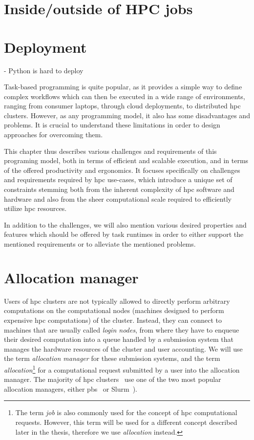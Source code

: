 \section{Inside/outside of HPC jobs}

\section{Deployment}
- Python is hard to deploy

Task-based programming is quite popular, as it provides a simple way to define complex workflows
which can then be executed in a wide range of environments, ranging from consumer laptops, through
cloud deployments, to distributed \gls{hpc} clusters. However, as any programming
model, it also has some disadvantages and problems. It is crucial to understand these limitations
in order to design approaches for overcoming them.

This chapter thus describes various challenges and requirements of this programing model, both in
terms of efficient and scalable execution, and in terms of the offered productivity and ergonomics.
It focuses specifically on challenges and requirements required by \gls{hpc}
use-cases, which introduce a unique set of constraints stemming both from the inherent complexity
of \gls{hpc} software and hardware and also from the sheer computational scale
required to efficiently utilize \gls{hpc} resources.

In addition to the challenges, we will also mention various desired properties and features which
should be offered by task runtimes in order to either support the mentioned requirements or to
alleviate the mentioned problems.

\section{Allocation manager}
\label{sec:allocation-manager}
Users of \gls{hpc} clusters are not typically allowed to directly perform
arbitrary computations on the computational nodes (machines designed to perform expensive
\gls{hpc} computations) of the cluster. Instead, they can connect to machines that
are usually called \emph{login nodes}, from where they have to enqueue their desired
computation into a queue handled by a submission system that manages the hardware resources of the
cluster and user accounting. We will use the term \emph{allocation manager} for these submission
systems, and the term \emph{allocation}\footnote{The term \emph{job} is also commonly used for the concept of
\gls{hpc} computational requests. However, this term will be used for a different concept described later in the thesis, therefore we use \emph{allocation} instead.} for a computational
request submitted by a user into the allocation manager. The majority of \gls{hpc}
clusters~\cite{slurm-schedmd} use one of the two most popular allocation managers, either
\gls{pbs}~\cite{pbs} or Slurm~\cite{slurm}).

